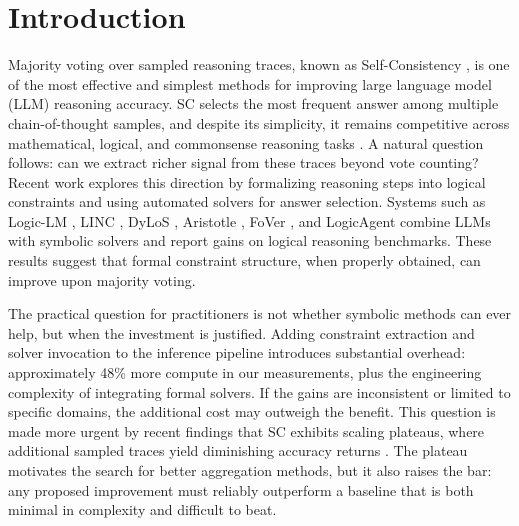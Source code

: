 \section{Introduction}
\label{sec:intro}

Majority voting over sampled reasoning traces, known as Self-Consistency \citep{wang2023sc}, is one of the most effective and simplest methods for improving large language model (LLM) reasoning accuracy. SC selects the most frequent answer among multiple chain-of-thought samples, and despite its simplicity, it remains competitive across mathematical, logical, and commonsense reasoning tasks \citep{chen2024usc, taubenfeld2025cisc}. A natural question follows: can we extract richer signal from these traces beyond vote counting? Recent work explores this direction by formalizing reasoning steps into logical constraints and using automated solvers for answer selection. Systems such as Logic-LM \citep{pan2023logiclm}, LINC \citep{olausson2023linc}, DyLoS \citep{xu2026dylos}, Aristotle \citep{li2025aristotle}, FoVer \citep{wang2025fover}, and LogicAgent \citep{luo2025logicagent} combine LLMs with symbolic solvers and report gains on logical reasoning benchmarks. These results suggest that formal constraint structure, when properly obtained, can improve upon majority voting.

The practical question for practitioners is not whether symbolic methods can ever help, but when the investment is justified. Adding constraint extraction and solver invocation to the inference pipeline introduces substantial overhead: approximately 48\% more compute in our measurements, plus the engineering complexity of integrating formal solvers. If the gains are inconsistent or limited to specific domains, the additional cost may outweigh the benefit. This question is made more urgent by recent findings that SC exhibits scaling plateaus, where additional sampled traces yield diminishing accuracy returns \citep{loo2025reevaluating}. The plateau motivates the search for better aggregation methods, but it also raises the bar: any proposed improvement must reliably outperform a baseline that is both minimal in complexity and difficult to beat.

